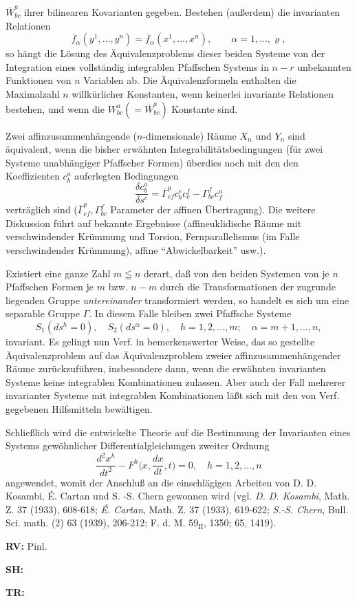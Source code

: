 {$\overline{W}_{bc}^a$ ihrer bilinearen
Kovarianten gegeben. Bestehen (au{\ss}erdem) die invarianten
Relationen
$$
\overline{f}_\alpha (y^1, \ldots , y^n)=\overline{f}_\alpha (x^1, \ldots, x^n),
\qquad \alpha =1, \ldots , \varrho,
$$
so h\"angt die L\"osung des \"Aquivalenzproblems dieser beiden Systeme von der
Integration
eines vollst\"andig
integrablen Pfaffschen Systems in $n- r$ unbekannten Funktionen
von $n$ Variablen ab. Die \"Aquivalenzformeln enthalten die Maximalzahl $n$
willk\"urlicher
Konstanten, wenn keinerlei
invariante Relationen bestehen, und wenn die
$W^a_{bc}(=\overline{W}_{bc}^a)$
Konstante sind.
\par
 Zwei affinzusammenh\"angende ($n$-dimensionale) R\"aume $X_n$ und $Y_n$ sind
\"aquivalent, wenn die
bisher erw\"ahnten Integrabilit\"atsbedingungen (f\"ur zwei Systeme
unabh\"angiger Pfaffscher Formen) \"uberdies noch mit den den Koeffizienten
$c_b^a$ auferlegten Bedingungen
$$
\dfrac{\delta c_b^a}{\delta s^c}=
\overline{\varGamma}^a_{ef}c_b^e c_c^f-\varGamma_{bc}^fc_f^a
$$
vertr\"aglich sind ($\overline{\varGamma}^a_{ef}, \varGamma _{bc}^f$ Parameter der affinen \"Ubertragung). Die weitere
Diskussion f\"uhrt auf bekannte Ergebnisse (affineuklidische R\"aume mit
verschwindender
Kr\"ummung und Torsion, Fernparallelismus (im Falle verschwindender Kr\"ummung),
affine ``Abwickelbarkeit'' usw.).
\par
Existiert eine ganze Zahl $m \leqq n$ derart, da{\ss} von den beiden Systemen
von
je $n$ Pfaffschen Formen je $m$ bzw. $n - m$ durch die Transformationen der zugrunde
liegenden Gruppe {\it untereinander} transformiert werden, so handelt es sich um eine
separable Gruppe $\varGamma$. In diesem Falle bleiben zwei Pfaffsche Systeme
$$
S_1(ds^h = 0),\quad S_2(ds^\alpha=0),\quad h= 1, 2,\ldots, m;
\quad \alpha = m+1,\ldots, n,
$$
invariant. Es gelingt nun Verf. in bemerkenswerter Weise, das so gestellte
\"Aquivalenzproblem
auf das \"Aquivalenzproblem zweier affinzusammenh\"angender R\"aume
zur\"uckzuf\"uhren,
insbesondere dann, wenn die erw\"ahnten invarianten Systeme keine
integrablen Kombinationen
zulassen. Aber auch der Fall mehrerer invarianter Systeme
mit integrablen Kombinationen l\"a{\ss}t sich mit den von Verf. gegebenen
Hilfsmitteln
bew\"altigen.
\par
 Schlie{\ss}lich wird die entwickelte Theorie auf die Bestimmung der
Invarianten
eines Systems gew\"ohnlicher Differentialgleichungen zweiter Ordnung
$$
\dfrac{d^2x^h}{dt^2}-F^h\biggl(x,\dfrac{dx}{dt}, t\biggr)=0, \quad h=1,2,\ldots, n
$$
angewendet, womit der Anschlu{\ss} an die einschl\"agigen Arbeiten von D. D.
Kosambi,
\'E. Cartan und S. -S.
Chern gewonnen wird (vgl. {\it D. D. Kosambi}, Math. Z. 37 (1933),
608-618; {\it \'E. Cartan},
Math. Z. 37 (1933), 619-622; {\it S.-S. Chern}, Bull. Sci. math. (2)
63 (1939), 206-212; F. d. M. 59$_{\text{II}}$, 1350; 65, 1419).
}
\item{\bf RV:} Pinl.
\item{\bf SH:}
\item{\bf TR:}

